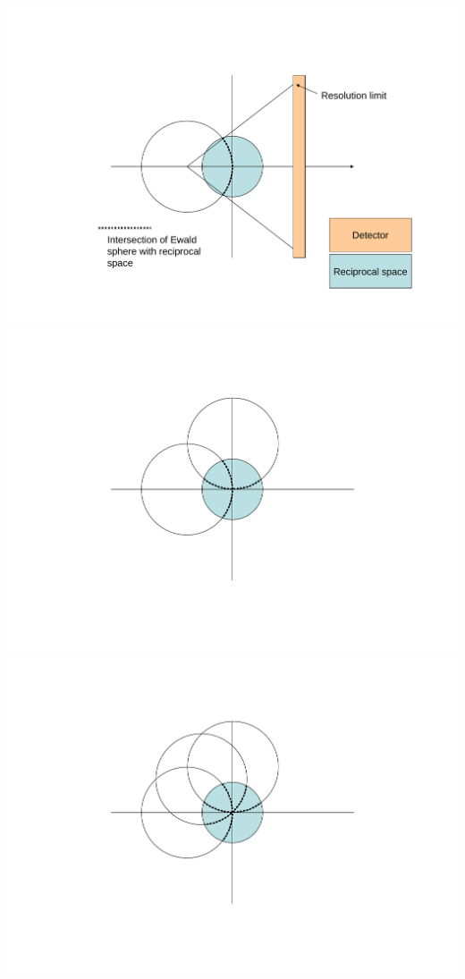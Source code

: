 \documentclass[a4paper, 11pt]{article}
\begin{document}
\includegraphics[scale=0.5]{figures/EwaldExplain.pdf}
\includegraphics[scale=0.5]{figures/Ewald2Image.pdf}
\includegraphics[scale=0.5]{figures/Ewald3Image.pdf}
\end{document}
